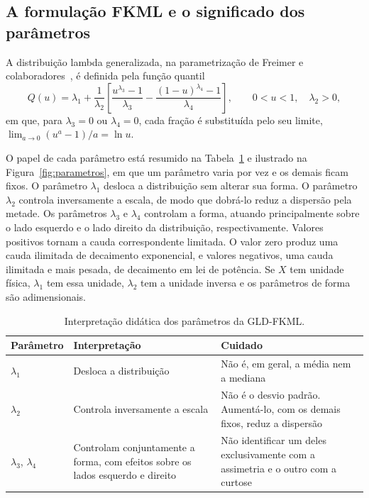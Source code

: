 

\subsection{A formulação FKML e o significado dos parâmetros}

A distribuição lambda generalizada, na parametrização de Freimer e colaboradores~\cite{freimer1988}, é definida pela função quantil
\begin{equation}
    Q(u) = \lambda_1 + \frac{1}{\lambda_2}
    \left[\frac{u^{\lambda_3} - 1}{\lambda_3} - \frac{(1-u)^{\lambda_4} - 1}{\lambda_4}\right],
    \qquad 0 < u < 1, \quad \lambda_2 > 0,
    \label{eq:fkml}
\end{equation}
em que, para $\lambda_3 = 0$ ou $\lambda_4 = 0$, cada fração é substituída pelo seu limite, $\lim_{a \to 0} (u^a - 1)/a = \ln u$.

O papel de cada parâmetro está resumido na Tabela~\ref{tab:parametros} e ilustrado na Figura~\ref{fig:parametros}, em que um parâmetro varia por vez e os demais ficam fixos. O parâmetro $\lambda_1$ desloca a distribuição sem alterar sua forma. O parâmetro $\lambda_2$ controla inversamente a escala, de modo que dobrá-lo reduz a dispersão pela metade. Os parâmetros $\lambda_3$ e $\lambda_4$ controlam a forma, atuando principalmente sobre o lado esquerdo e o lado direito da distribuição, respectivamente. Valores positivos tornam a cauda correspondente limitada. O valor zero produz uma cauda ilimitada de decaimento exponencial, e valores negativos, uma cauda ilimitada e mais pesada, de decaimento em lei de potência. Se $X$ tem unidade física, $\lambda_1$ tem essa unidade, $\lambda_2$ tem a unidade inversa e os parâmetros de forma são adimensionais.

\begin{table}[htbp]
\centering
\caption{Interpretação didática dos parâmetros da GLD-FKML.}
\label{tab:parametros}
\small
\begin{tabular}{p{2.1cm} p{5.4cm} p{6.5cm}}
\toprule
\textbf{Parâmetro} & \textbf{Interpretação} & \textbf{Cuidado} \\
\midrule
$\lambda_1$ & Desloca a distribuição & Não é, em geral, a média nem a mediana \\
$\lambda_2$ & Controla inversamente a escala & Não é o desvio padrão. Aumentá-lo, com os demais fixos, reduz a dispersão \\
$\lambda_3$, $\lambda_4$ & Controlam conjuntamente a forma, com efeitos sobre os lados esquerdo e direito & Não identificar um deles exclusivamente com a assimetria e o outro com a curtose \\
\bottomrule
\end{tabular}
\end{table}

